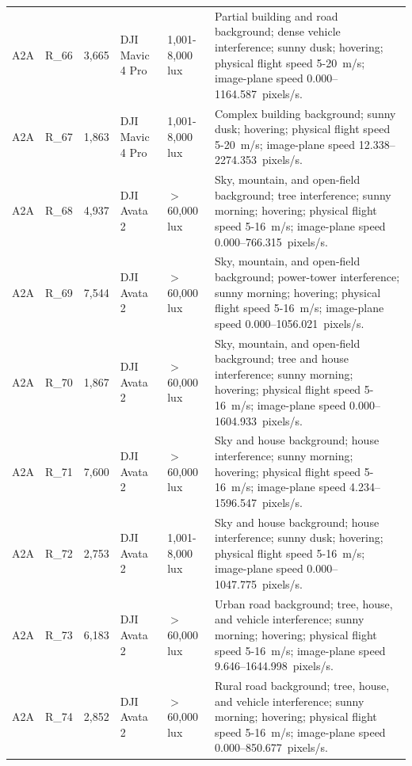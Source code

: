 \begin{longtable}{@{}C{0.045\textwidth} C{0.083\textwidth} C{0.075\textwidth} C{0.13\textwidth} C{0.15\textwidth} L{0.48\textwidth}@{}}
A2A & R\_66 & 3,665 & DJI Mavic 4 Pro & 1,001-8,000 lux & Partial building and road background; dense vehicle interference; sunny dusk; hovering; physical flight speed 5-20~m/s; image-plane speed 0.000--1164.587~pixels/s. \\

A2A & R\_67 & 1,863 & DJI Mavic 4 Pro & 1,001-8,000 lux & Complex building background; sunny dusk; hovering; physical flight speed 5-20~m/s; image-plane speed 12.338--2274.353~pixels/s. \\

A2A & R\_68 & 4,937 & DJI Avata 2 & $>$60,000 lux & Sky, mountain, and open-field background; tree interference; sunny morning; hovering; physical flight speed 5-16~m/s; image-plane speed 0.000--766.315~pixels/s. \\

A2A & R\_69 & 7,544 & DJI Avata 2 & $>$60,000 lux & Sky, mountain, and open-field background; power-tower interference; sunny morning; hovering; physical flight speed 5-16~m/s; image-plane speed 0.000--1056.021~pixels/s. \\

A2A & R\_70 & 1,867 & DJI Avata 2 & $>$60,000 lux & Sky, mountain, and open-field background; tree and house interference; sunny morning; hovering; physical flight speed 5-16~m/s; image-plane speed 0.000--1604.933~pixels/s. \\

A2A & R\_71 & 7,600 & DJI Avata 2 & $>$60,000 lux & Sky and house background; house interference; sunny morning; hovering; physical flight speed 5-16~m/s; image-plane speed 4.234--1596.547~pixels/s. \\

A2A & R\_72 & 2,753 & DJI Avata 2 & 1,001-8,000 lux & Sky and house background; house interference; sunny dusk; hovering; physical flight speed 5-16~m/s; image-plane speed 0.000--1047.775~pixels/s. \\

A2A & R\_73 & 6,183 & DJI Avata 2 & $>$60,000 lux & Urban road background; tree, house, and vehicle interference; sunny morning; hovering; physical flight speed 5-16~m/s; image-plane speed 9.646--1644.998~pixels/s. \\

A2A & R\_74 & 2,852 & DJI Avata 2 & $>$60,000 lux & Rural road background; tree, house, and vehicle interference; sunny morning; hovering; physical flight speed 5-16~m/s; image-plane speed 0.000--850.677~pixels/s. \\


\end{longtable}
